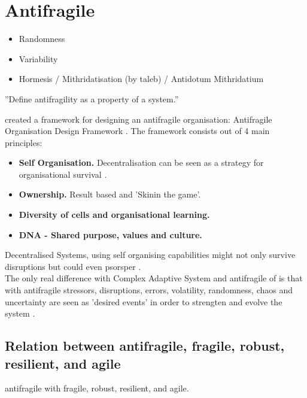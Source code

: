 \section{Antifragile}
\label{sec:tbantifragile}

\begin{itemize}
	\item{Randomness}
	\item{Variability}
	\item{Hormesis / Mithridatisation (by taleb) / Antidotum Mithridatium}
\end{itemize}

''Define antifragility as a property of a system.'' \parencite{Jaaron2014}

\citeauthor{Kastner2017} created a framework for designing an antifragile organisation: Antifragile Organisation Design Framework \citeyear{Kastner2017}. The framework consists out of 4 main principles:
\begin{itemize}
	\item{\textbf{Self Organisation.} Decentralisation can be seen as a strategy for organisational survival \parencite{Brafman2007}.}
	\item{\textbf{Ownership.} Result based and 'Skinin the game'.}
	\item{\textbf{Diversity of cells and organisational learning.}}
	\item{\textbf{DNA - Shared purpose, values and culture.}}
\end{itemize}

Decentralised Systems, using self organising capabilities might not only survive disruptions but could even psorsper \parencite{Brafman2007}.\\
The only real difference with Complex Adaptive System and antifragile of \textcite{Taleb2013} is that with antifragile stressors, disruptions, errors, volatility, randomness, chaos and uncertainty are seen as 'desired events' in order to strengten and evolve the system \parencite{Jaaron2014}.

\subsection{Relation between antifragile, fragile, robust, resilient, and agile}
\label{sub:tbrelatedtoantifragile}

\gls{antifragile} with \gls{fragile}, \gls{robust}, \gls{resilient}, and \gls{agile}.

